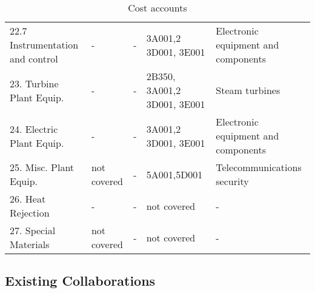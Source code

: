 \begin{table}[h!]
{\begin{tabular}{p{4cm}p{3cm}p{3cm}p{3cm}p{3cm}}
        22.7 Instrumentation and control & - & - & 3A001,2 3D001, 3E001 &  Electronic equipment and components \\
        23. Turbine Plant Equip. & - & - & 2B350, 3A001,2 3D001, 3E001 & Steam turbines \\
        24. Electric Plant Equip. & - & - & 3A001,2 3D001, 3E001 &  Electronic equipment and components \\
        25. Misc. Plant Equip. & not covered & - & 5A001,5D001 & Telecommunications security \\
        26. Heat Rejection & - & - & not covered & - \\
        27. Special Materials & not covered & - & not covered & - \\
        \hline  
    \end{tabular}}
    \caption{Cost accounts}
    \label{tab:costs}
\end{table}

\subsection{Existing Collaborations}